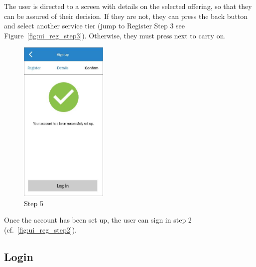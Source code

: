 The user is directed to a screen with details on the selected offering, so that they can be assured of their decision. If they are not, they can press the back button and select another service tier (jump to Register Step 3 see Figure~\ref{fig:ui_reg_step3}). Otherwise, they must press next to carry on.

\begin{figure}
  \centering
  \begin{minipage}{4.6cm}
    \centering
    \includegraphics[width=4.2cm]{inc/ui_reg_step5.jpg}
    \caption{Step 5}
    \label{fig:ui_step5}
  \end{minipage}
\end{figure}

\begin{minipage}{14cm}
  \centering
  \begin{minipage}{4.4cm}
    Once the account has been set up, the user can sign in step 2 (cf.~\ref{fig:ui_reg_step2}).
  \end{minipage}
\end{minipage}

\subsection{Login}

